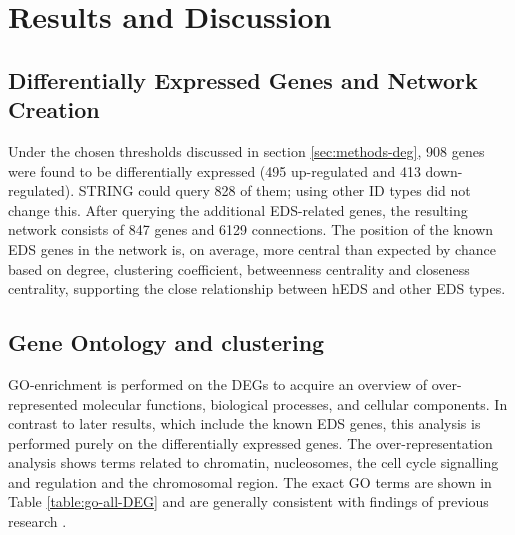 \section{Results and Discussion}
\subsection{Differentially Expressed Genes and Network Creation}

Under the chosen thresholds discussed in section \ref{sec:methods-deg}, 908 genes were found to be differentially expressed (495 up-regulated and 413 down-regulated). STRING could query 828 of them; using other ID types did not change this. After querying the additional EDS-related genes, the resulting network consists of 847 genes and 6129 connections. The position of the known EDS genes in the network is, on average, more central than expected by chance based on degree, clustering coefficient, betweenness centrality and closeness centrality, supporting the close relationship between hEDS and other EDS types.

\subsection{Gene Ontology and clustering}

GO-enrichment is performed on the DEGs to acquire an overview of over-represented molecular functions, biological processes, and cellular components. In contrast to later results, which include the known EDS genes, this analysis is performed purely on the differentially expressed genes. The over-representation analysis shows terms related to chromatin, nucleosomes, the cell cycle signalling and regulation and the chromosomal region. The exact GO terms are shown in Table \ref{table:go-all-DEG} and are generally consistent with findings of previous research \cite{Chiarelli2018, Ritelli2022, Gensemer2021}.



